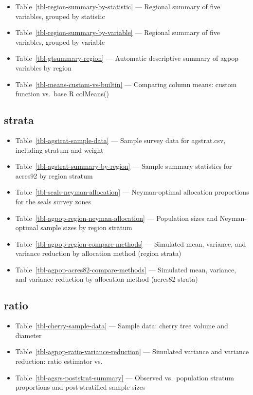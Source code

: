 \documentclass[
  letterpaper,
  DIV=11,
  numbers=noendperiod]{scrreprt}
\providecommand{\tightlist}{%
  \setlength{\itemsep}{0pt}\setlength{\parskip}{0pt}}
\renewcommand{\[}{\begin{equation}}
\renewcommand{\]}{\end{equation}}
\begin{document}
\begin{itemize}
\tightlist
\item
  Table~\ref{tbl-region-summary-by-statistic} --- Regional summary of
  five variables, grouped by statistic
\item
  Table~\ref{tbl-region-summary-by-variable} --- Regional summary of
  five variables, grouped by variable
\item
  Table~\ref{tbl-gtsummary-region} --- Automatic descriptive summary of
  agpop variables by region
\item
  Table~\ref{tbl-means-custom-vs-builtin} --- Comparing column means:
  custom function vs.~base R colMeans()
\end{itemize}

\subsection{strata}\label{strata-1}

\begin{itemize}
\tightlist
\item
  Table~\ref{tbl-agstrat-sample-data} --- Sample survey data for
  agstrat.csv, including stratum and weight
\item
  Table~\ref{tbl-agstrat-summary-by-region} --- Sample summary
  statistics for acres92 by region stratum
\item
  Table~\ref{tbl-seals-neyman-allocation} --- Neyman-optimal allocation
  proportions for the seals survey zones
\item
  Table~\ref{tbl-agpop-region-neyman-allocation} --- Population sizes
  and Neyman-optimal sample sizes by region stratum
\item
  Table~\ref{tbl-agpop-region-compare-methods} --- Simulated mean,
  variance, and variance reduction by allocation method (region strata)
\item
  Table~\ref{tbl-agpop-acres82-compare-methods} --- Simulated mean,
  variance, and variance reduction by allocation method (acres82 strata)
\end{itemize}

\subsection{ratio}\label{ratio-1}

\begin{itemize}
\tightlist
\item
  Table~\ref{tbl-cherry-sample-data} --- Sample data: cherry tree volume
  and diameter
\item
  Table~\ref{tbl-agpop-ratio-variance-reduction} --- Simulated variance
  and variance reduction: ratio estimator vs.
\item
  Table~\ref{tbl-agsrs-poststrat-summary} --- Observed vs.~population
  stratum proportions and post-stratified sample sizes
\end{itemize}
\end{document}
